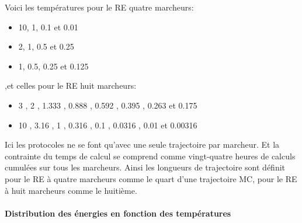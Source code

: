 Voici les températures pour le RE quatre marcheurs:

\begin{itemize} 
\item 10, 1, 0.1 et 0.01
\item 2, 1, 0.5 et 0.25 
\item 1, 0.5, 0.25 et 0.125
\end{itemize} 

,et celles pour le RE huit marcheurs:

\begin{itemize} 
\item 3 , 2 , 1.333 , 0.888 , 0.592 , 0.395 , 0.263 et 0.175 
\item 10 , 3.16 , 1 , 0.316 , 0.1 , 0.0316 , 0.01 et 0.00316
\end{itemize} 

Ici les protocoles ne se font qu'avec une seule trajectoire par marcheur. Et la contrainte du temps de calcul se comprend comme vingt-quatre heures de calculs cumulées sur tous les marcheurs.
Ainsi les longueurs de trajectoire sont définit pour le RE à quatre marcheurs comme le quart d'une trajectoire MC, pour le RE à huit marcheurs comme le huitième.


\paragraph{Distribution des énergies en fonction des températures}

